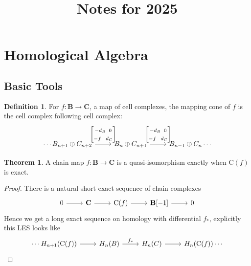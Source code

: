 \documentclass[11pt]{article}
\title{Notes for 2025}
\theoremstyle{definition}
\newtheorem{defn}{Definition}
\newtheorem{thm}{Theorem}
\begin{document}
    \maketitle
    \newpage

    \section{Homological Algebra}

    \subsection{Basic Tools}

    \begin{defn}\label{cone}
        For \(f: \mathbf{B} \to \mathbf{C}\), a map of cell complexes, the mapping cone of \(f\) is the cell complex following cell complex:
        \begin{equation*}
            \begin{tikzcd}
                \cdots B_{n+1}\oplus C_{n+2} \arrow[r,"{\begin{bmatrix} -d_B \;\; 0 \\ -f \;\;\; d_C \end{bmatrix}}"] & B_n \oplus C_{n+1} \arrow[r,"{\begin{bmatrix} -d_B \;\; 0 \\ -f \;\;\; d_C \end{bmatrix}}"] & B_{n-1} \oplus C_n \cdots
            \end{tikzcd}
        \end{equation*}
    \end{defn}

    \begin{thm}\label{cone exact}
        A chain map \(f: \mathbf{B} \to \mathbf{C}\) is a quasi-isomorphism exactly when \(\text{C}(f)\) is exact.
    \end{thm}
    \begin{proof}
        There is a natural short exact sequence of chain complexes
        \begin{equation*}
            \begin{tikzcd}
                0 \arrow[r,"{}"] &\mathbf{C} \arrow[r,"{}"] &\text{C}(f) \arrow[r,"{}"] &\mathbf{B}[-1] \arrow[r,"{}"] &0
            \end{tikzcd}
        \end{equation*}
        Hence we get a long exact sequence on homology with differential \(f_*\), explicitly this LES looks like
        \begin{equation*}
            \begin{tikzcd}
                \cdots H_{n+1}(\text{C}(f)) \arrow[r,"{}"] &H_{n}(B) \arrow[r,"{f_*}"] &H_n(C) \arrow[r,"{}"] &H_n(\text{C}(f))\cdots
            \end{tikzcd}
        \end{equation*}
    \end{proof}
\end{document}
